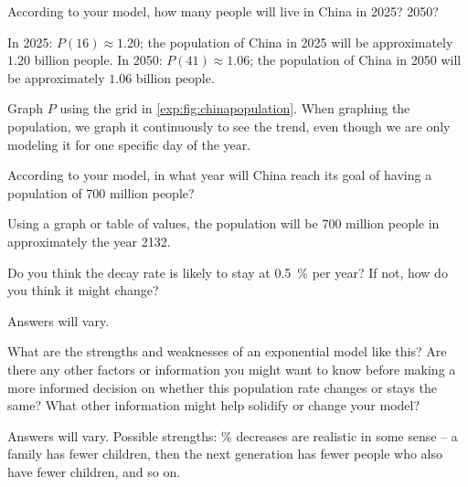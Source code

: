 \begin{exercises}
\begin{problem}
\begin{subproblem}
\begin{shortsolution}
	\end{shortsolution}
\end{subproblem}
\begin{subproblem}
	According to your model, how many people will live in China in 2025? 2050? 
	\begin{shortsolution}
		In 2025: $P(16)\approx 1.20$; the population of China in 2025 will be approximately $1.20$ billion people.
		In 2050: $P(41)\approx 1.06$; the population of China in 2050 will be approximately $1.06$ billion people.
	\end{shortsolution}
\end{subproblem}
\begin{subproblem}
	Graph $P$ using the grid in \cref{exp:fig:chinapopulation}. When graphing the population, we graph it
	continuously to see the trend, even though we are only modeling it for one specific day of the year. 
	\begin{shortsolution}
	\end{shortsolution}
\end{subproblem}
\begin{subproblem}
	According to your model, in what year will China reach its goal of having a population of 700 million people?
	\begin{shortsolution}
		Using a graph or table of values, the population will be 700 million people in approximately the year 2132.
	\end{shortsolution}
\end{subproblem}
\begin{subproblem}
	Do you think the decay rate is likely to stay at \SI{0.5}{\percent} per year? If not, how do 
	you think it might change?
	\begin{shortsolution}
		Answers will vary.
	\end{shortsolution}
\end{subproblem}
\begin{subproblem}\label{exp:prob:chinapopStrWeak}
	What are the strengths and weaknesses of an exponential model like this?
	Are there any other factors or information you might want to know before making 
	a more informed decision on whether this population rate changes or stays the same? What 
	other information might help solidify or change your model?
	\begin{shortsolution}
		Answers will vary.
		Possible strengths: \% decreases are realistic in some sense -- a family has fewer children, then 
		the next generation has fewer people who also have fewer children, and so on.
																			

\end{shortsolution}
\end{subproblem}
\end{problem}
\end{exercises}
